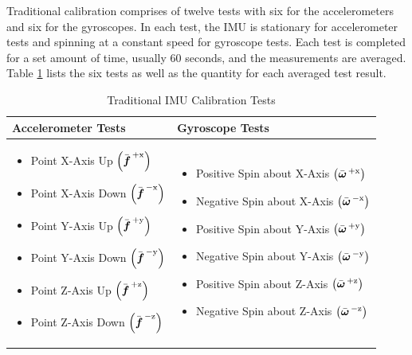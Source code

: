 Traditional calibration comprises of twelve tests with six for the accelerometers and six for the gyroscopes. In each test, the IMU is stationary for accelerometer tests and spinning at a constant speed for gyroscope tests. Each test is completed for a set amount of time, usually 60 seconds, and the measurements are averaged. Table \ref{tab: traditional_calibration_tests} lists the six tests as well as the quantity for each averaged test result.

\begin{table}[h!]
	\centering
	\begin{tabular}{|p{7cm}|p{7cm}|}
		\hline
		\textbf{Accelerometer Tests} & \textbf{Gyroscope Tests} \\ \hline
		\begin{itemize}
			\item Point X-Axis Up $\left(\bar{\boldsymbol{f}}^{\,+\textrm{x}}\right)$
			\item Point X-Axis Down $\left(\bar{\boldsymbol{f}}^{\,-\textrm{x}}\right)$
			\item Point Y-Axis Up $\left(\bar{\boldsymbol{f}}^{\,+\textrm{y}}\right)$
			\item Point Y-Axis Down $\left(\bar{\boldsymbol{f}}^{\,-\textrm{y}}\right)$
			\item Point Z-Axis Up $\left(\bar{\boldsymbol{f}}^{\,+\textrm{z}}\right)$
			\item Point Z-Axis Down $\left(\bar{\boldsymbol{f}}^{\,-\textrm{z}}\right)$
		\end{itemize}
		&
		\begin{itemize}
			\item Positive Spin about X-Axis $\left(\bar{\boldsymbol{\omega}}^{\,+\textrm{x}}\right)$
			\item Negative Spin about X-Axis $\left(\bar{\boldsymbol{\omega}}^{\,-\textrm{x}}\right)$
			\item Positive Spin about Y-Axis $\left(\bar{\boldsymbol{\omega}}^{\,+\textrm{y}}\right)$
			\item Negative Spin about Y-Axis $\left(\bar{\boldsymbol{\omega}}^{\,-\textrm{y}}\right)$
			\item Positive Spin about Z-Axis $\left(\bar{\boldsymbol{\omega}}^{\,+\textrm{z}}\right)$
			\item Negative Spin about Z-Axis $\left(\bar{\boldsymbol{\omega}}^{\,-\textrm{z}}\right)$
		\end{itemize} \\ \hline
	\end{tabular}
	\caption{Traditional IMU Calibration Tests}
	\label{tab: traditional_calibration_tests}
\end{table}
\FloatBarrier

